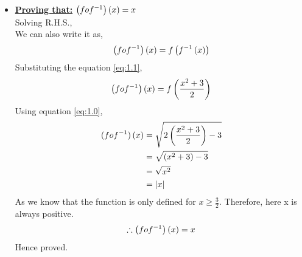 \documentclass[journal,12pt,twocolumn]{IEEEtran}
\begin{document}
\begin{itemize}
	\item
	\textbf{\underline{Proving that:}} $\left(fof^{-1}\right)\left(x\right)=x$\\
	Solving R.H.S.,\\
	We can also write it as,
	\begin{align}
	\left(fof^{-1}\right)\left(x\right) = f\left(f^{-1}\left(x\right)\right)
	\end{align}
	Substituting the equation \eqref{eq:1.1},
	\begin{align}
	\left(fof^{-1}\right)\left(x\right) = f\left(\frac{x^{2} + 3}{2}\right)
	\end{align}
	Using equation \eqref{eq:1.0},
	\begin{align}
	(fof^{-1})\left(x\right) &= \sqrt{2\left(\frac{x^{2} + 3}{2}\right) - 3}\\
	                   &= \sqrt{(x^{2} + 3) - 3}\\
	                   &= \sqrt{x^{2}}\\
	                   &= \left\vert x\right\vert
	\end{align}
	As we know that the function is only defined for $x \geq \frac{3}{2}$. Therefore, here x is always positive.
	\begin{align}
	\therefore\left(fof^{-1}\right)\left(x\right) = x
	\end{align}
	Hence proved.
	\end{itemize}
\end{document}
